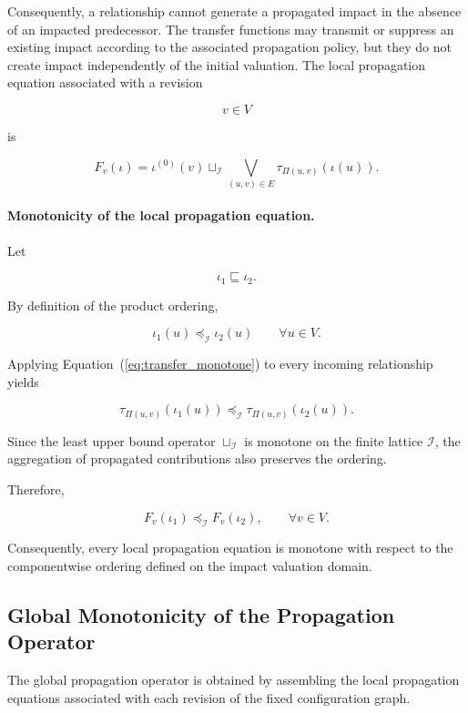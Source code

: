 \documentclass[10pt]{article}
\begin{document}
Consequently, a relationship cannot generate a propagated impact in the absence
of an impacted predecessor. The transfer functions may transmit or suppress an
existing impact according to the associated propagation policy, but they do not
create impact independently of the initial valuation.
The local propagation equation associated with a revision

\[
v\in V
\]

is

\[
F_v(\iota)
=
\iota^{(0)}(v)
\sqcup_{\mathcal I}
\bigvee_{(u,v)\in E}
\tau_{\Pi(u,v)}
(
\iota(u)
).
\]

\paragraph{Monotonicity of the local propagation equation.}

Let

\[
\iota_1
\sqsubseteq
\iota_2.
\]

By definition of the product ordering,

\[
\iota_1(u)
\preceq_{\mathcal I}
\iota_2(u)
\qquad
\forall u\in V.
\]

Applying Equation~(\ref{eq:transfer_monotone}) to every incoming relationship
yields

\[
\tau_{\Pi(u,v)}
(
\iota_1(u)
)
\preceq_{\mathcal I}
\tau_{\Pi(u,v)}
(
\iota_2(u)
).
\]

Since the least upper bound operator
$\sqcup_{\mathcal I}$
is monotone on the finite lattice
$\mathcal I$,
the aggregation of propagated contributions also preserves the ordering.

Therefore,

\begin{equation}
	\label{eq:local_monotone}
	F_v(\iota_1)
	\preceq_{\mathcal I}
	F_v(\iota_2),
	\qquad
	\forall v\in V.
\end{equation}

Consequently, every local propagation equation is monotone with respect to the
componentwise ordering defined on the impact valuation domain.

\subsection{Global Monotonicity of the Propagation Operator}
\label{appendix:global_monotonicity}
The global propagation operator is obtained by assembling the local propagation
equations associated with each revision of the fixed configuration graph.
\end{document}

